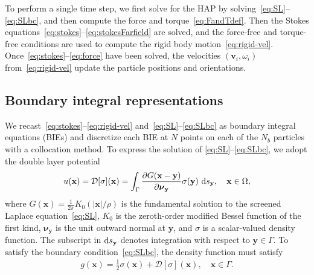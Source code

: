 \documentclass[prb,preprint,showpacs,preprintnumbers,amsmath,amssymb,longbibliography]{revtex4-1}
\newcommand{\DD}{\mathcal{D}}
\newcommand{\nnu}{\boldsymbol{\nu}}
\newcommand{\xx}{\mathbf{x}}
\renewcommand{\vv}{\mathbf{v}}
\newcommand{\yy}{\mathbf{y}}
\newcommand{\pderiv}[2]{\frac{\partial #1}{\partial #2}}
\begin{document}
To perform a single time step, we first solve for the HAP by
solving~\eqref{eq:SL}--\eqref{eq:SLbc}, and then compute the force and
torque~\eqref{eq:FandTdef}. Then the Stokes
equations~\eqref{eq:stokes}--\eqref{eq:stokesFarfield} are solved, and
the force-free and torque-free conditions are used to compute the rigid
body motion~\eqref{eq:rigid-vel}.
Once~\eqref{eq:stokes}--\eqref{eq:force} have been solved, the
velocities $(\vv_i, \omega_i)$ from~\eqref{eq:rigid-vel} update the
particle positions and orientations.


\subsection{Boundary integral representations}
We recast~\eqref{eq:stokes}--\eqref{eq:rigid-vel}
and~\eqref{eq:SL}--\eqref{eq:SLbc} as boundary integral equations (BIEs)
and discretize each BIE at $N$ points on each of the $N_b$ particles
with a collocation method. To express the solution of
\eqref{eq:SL}--\eqref{eq:SLbc}, we adopt the double layer potential
\begin{align}
\label{eq:SL_BIE}
u({\xx}) = \DD[\sigma](\xx) = \int_\Gamma 
  \pderiv{G(\xx-\yy)}{\nnu_\yy}\sigma(\yy)\, \dif s_\yy, 
  \quad \xx \in \Omega,
\end{align}
where $G(\xx) = \frac{1}{2\pi}K_0(|\xx|/\rho)$ is the fundamental
solution to the screened Laplace equation~\eqref{eq:SL}, $K_0$ is the
zeroth-order modified Bessel function of the first kind, $\nnu_\yy$ is
the unit outward normal at $\yy$, and $\sigma$ is a scalar-valued
density function. The subscript in $\dif s_\yy$ denotes integration with
respect to $\yy \in \Gamma$. To satisfy the boundary
condition~\eqref{eq:SLbc}, the density function must satisfy\cite{Hsiao2008}
\begin{align}
  \label{eq:SL_BIE2}
  g(\xx) = \frac{1}{2} \sigma(\xx) + \DD[\sigma](\xx), \quad
    \xx \in \Gamma.
\end{align}
\end{document}
